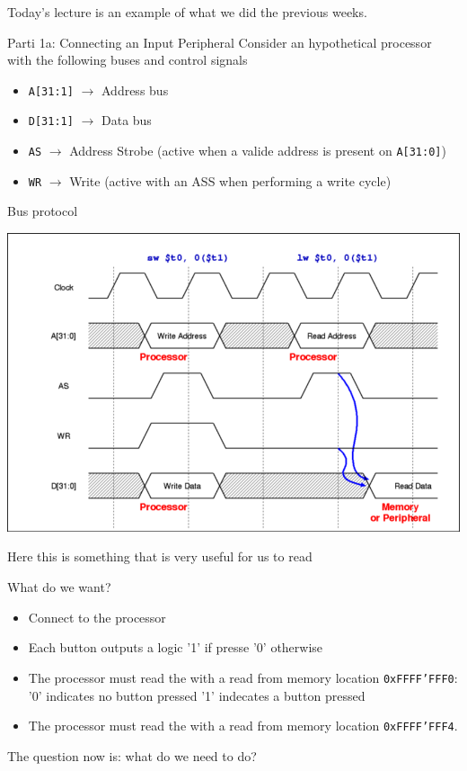 Today's lecture is an example of what we did the previous weeks.
\begin{parag}{Parti 1a: Connecting an Input Peripheral}
	Consider an hypothetical processor with the following buses and control signals
	\begin{itemize}
		\item \texttt{A[31:1]} $\to $ Address bus 
		\item \texttt{D[31:1]} $\to $ Data bus 
		\item \texttt{AS} $\to $ Address Strobe (active when a valide address is present on \texttt{A[31:0]})
		\item \texttt{WR} $\to$ Write (active with an ASS when performing a write cycle)
	\end{itemize}
	\begin{subparag}{Bus protocol}
	\begin{center}
	\includegraphics[scale=0.3]{screenshots/2025-10-17_3.png}
	\end{center}
    Here this is something that is very useful for us to read
	\end{subparag}
	\begin{subparag}{What do we want?}
	    \begin{itemize}
			\item Connect to the processor 
			\item Each button outputs a logic '1' if presse '0' otherwise 
			\item The processor must read the  with a read from memory location \texttt{0xFFFF'FFF0}: '0' indicates no button pressed '1' indecates a button pressed 
			\item The processor must read the  with a read from memory location \texttt{0xFFFF'FFF4}.
	    \end{itemize}
	\end{subparag}
	The question now is: what do we need to do?\\
\end{parag}
